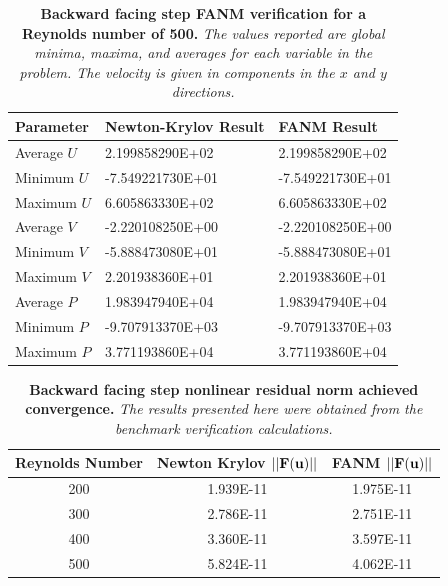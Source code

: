 \begin{table}[h!]
  \begin{center}
    \begin{tabular}{lll}\hline\hline
      \multicolumn{1}{l}{Parameter}& 
      \multicolumn{1}{l}{Newton-Krylov Result}&
      \multicolumn{1}{l}{FANM Result}\\
      \hline
      Average $U$ & 2.199858290E+02 & 2.199858290E+02 \\
      Minimum $U$ & -7.549221730E+01 & -7.549221730E+01 \\
      Maximum $U$ & 6.605863330E+02 & 6.605863330E+02 \\
      \hline
      Average $V$ & -2.220108250E+00 & -2.220108250E+00 \\
      Minimum $V$ & -5.888473080E+01 & -5.888473080E+01 \\
      Maximum $V$ & 2.201938360E+01 & 2.201938360E+01 \\
      \hline
      Average $P$ & 1.983947940E+04 & 1.983947940E+04 \\
      Minimum $P$ & -9.707913370E+03 & -9.707913370E+03 \\
      Maximum $P$ & 3.771193860E+04 & 3.771193860E+04 \\
      \hline\hline
    \end{tabular}
  \end{center}
  \caption{\textbf{Backward facing step FANM verification for a
      Reynolds number of 500.} \textit{The values reported are global
      minima, maxima, and averages for each variable in the
      problem. The velocity is given in components in the $x$ and $y$
      directions.}}
  \label{tab:step_re500_results}
\end{table}

\begin{table}[h!]
  \begin{center}
    \begin{tabular}{ccc}\hline\hline
      \multicolumn{1}{c}{Reynolds Number}& 
      \multicolumn{1}{c}{Newton Krylov $||\mathbf{F(\mathbf{u})}||$}&
      \multicolumn{1}{c}{FANM $||\mathbf{F(\mathbf{u})}||$}\\
      \hline
      200 & 1.939E-11 & 1.975E-11 \\
      300 & 2.786E-11 & 2.751E-11 \\
      400 & 3.360E-11 & 3.597E-11 \\
      500 & 5.824E-11 & 4.062E-11 \\
      \hline\hline
    \end{tabular}
  \end{center}
  \caption{\textbf{Backward facing step nonlinear residual norm
      achieved convergence.} \textit{The results presented here were
      obtained from the benchmark verification calculations.}}
  \label{tab:step_residual_norm_comparison}
\end{table}

